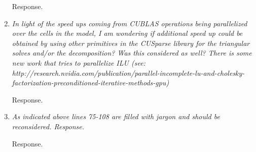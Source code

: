 \documentclass[12pt]{article} %
\begin{document}
\begin{enumerate}
Response.

\item \textit{In light of the speed ups coming from CUBLAS operations being parallelized over the cells in the model, I am wondering if additional speed up could be obtained by using other primitives in the CUSparse library for the triangular solves and/or the decomposition? Was this considered as well? There is some new work that tries to parallelize ILU (see: http://research.nvidia.com/publication/parallel-incomplete-lu-and-cholesky-factorization-preconditioned-iterative-methods-gpu) } 

Response.

\item \textit{As indicated above lines 75-108 are filled with jargon and should be reconsidered. 
Response.} 

Response.

\end{enumerate}
\end{document}
